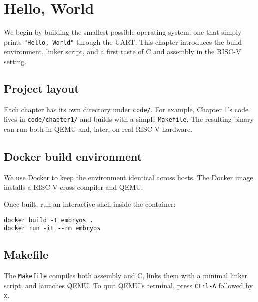 \chapter{Hello, World}

We begin by building the smallest possible operating system: one that simply prints
\texttt{"Hello, World"} through the UART.  
This chapter introduces the build environment, linker script, and a first taste of C and assembly in the RISC-V setting.

\section*{Project layout}

Each chapter has its own directory under \texttt{code/}.  
For example, Chapter 1’s code lives in \texttt{code/chapter1/} and builds with a simple \texttt{Makefile}.  
The resulting binary can run both in QEMU and, later, on real RISC-V hardware.

\section*{Docker build environment}

We use Docker to keep the environment identical across hosts.  
The Docker image installs a RISC-V cross-compiler and QEMU.

\begin{figure}[htb]
\centering

\end{figure}

Once built, run an interactive shell inside the container:
\begin{verbatim}
docker build -t embryos .
docker run -it --rm embryos
\end{verbatim}

\section*{Makefile}

The \texttt{Makefile} compiles both assembly and C, links them with a minimal linker script, and
launches QEMU.  
To quit QEMU’s terminal, press \texttt{Ctrl-A} followed by \texttt{x}.

\begin{figure}[htb]
\centering

\end{figure}

